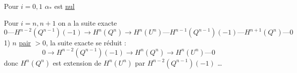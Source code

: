Pour $i=0,1$ $\alpha_*$ est \uline{nul}
\margin{[$i=1$, \deleted{\unsure{bij}} $\alpha$ bijectif, car les deux \unsure{mbs} nuls)}
    
Pour $i=n,n+1$ on a la suite exacte \margin{(si $\boxed{n\neq1}$ donc $n-1\neq0$]}
\[
0\text{---}H^{n-2}(Q^{n-1})(-1)\longrightarrow H^n(Q^n)
\longrightarrow H^n(U^n)\text{---}H^{n-1}(Q^{n-1})(-1)\text{---}H^{n+1}(Q^n)\text{---}0
\]
1) $n$ \uline{pair} $>0$, la suite exacte se réduit :
\[
0\longrightarrow H^{n-2}(Q^{n-1})(-1)\longrightarrow H^n(Q^n)\longrightarrow H^n(U^n)\text{---}0
\]
donc $H^n(Q^n)$ est extension de $H^n(U^n)$ par $H^{n-2}(Q^{n-1})(-1)$ \ldots
{}
